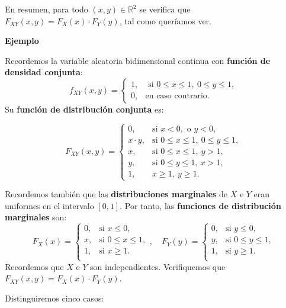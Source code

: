 \documentclass[]{book}
\begin{document}
En resumen, para todo \((x,y)\in \mathbb{R}^2\) se verifica que \(F_{XY}(x,y)=F_X(x)\cdot F_Y(y)\), tal como queríamos ver.

\textbf{Ejemplo}

Recordemos la variable aleatoria bidimensional continua con \textbf{función de densidad conjunta}:
\[
f_{XY}(x,y)=\begin{cases}
1, & \mbox{ si }0\leq x\leq 1,\ 0\leq y\leq 1, \\
0, & \mbox{en caso contrario.}
\end{cases}
\]
Su \textbf{función de distribución conjunta} es:

\[
F_{XY}(x,y)=\begin{cases}
0, & \mbox{si }x<0,\mbox{ o }y<0,\\
x\cdot y, & \mbox{si }0\leq x\leq 1,\ 0\leq y\leq 1, \\
x, & \mbox{si }0\leq x\leq 1,\ y> 1, \\
y, & \mbox{si }0\leq y\leq 1,\ x> 1, \\
1, & x\geq 1,\ y\geq 1.
\end{cases}
\]

Recordemos también que las \textbf{distribuciones marginales} de \(X\) e \(Y\) eran uniformes en el intervalo \([0,1]\). Por tanto, las \textbf{funciones de distribución marginales} son:
\[
F_X(x)=\begin{cases}
0, & \mbox{si }x\leq 0, \\
x, & \mbox{si }0\leq x\leq 1, \\
1, & \mbox{si }x\geq 1. \\
\end{cases},\quad 
F_Y(y)=\begin{cases}
0, & \mbox{si }y\leq 0, \\
y, & \mbox{si }0\leq y\leq 1, \\
1, & \mbox{si }y\geq 1. \\
\end{cases}
\]
Recordemos que \(X\) e \(Y\) son independientes. Verifiquemos que \(F_{XY}(x,y)=F_X(x)\cdot F_Y(y)\).

Distinguiremos cinco casos:
\end{document}
